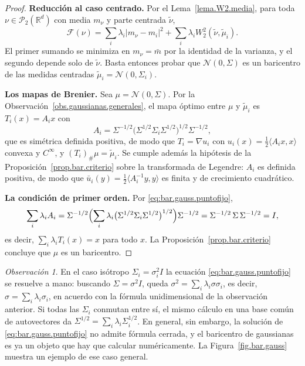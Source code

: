 \documentclass[12pt, a4paper]{amsbook}
\newcommand{\R}{{\mathbb R}}
\theoremstyle{remark}
\newtheorem{obs}[teo]{Observación}
\theoremstyle{definition}
\numberwithin{section}{chapter}
\numberwithin{subsection}{section}
\numberwithin{equation}{section}
\numberwithin{figure}{chapter}
\begin{document}
\begin{proof}
\textbf{Reducción al caso centrado.} Por el Lema~\ref{lema.W2.media}, para
toda $\nu\in\mathcal P_2(\R^d)$ con media $m_\nu$ y parte centrada
$\widetilde\nu$,
\[
\mathcal F(\nu)=\sum_i\lambda_i|m_\nu-m_i|^2+\sum_i\lambda_iW_2^2(\widetilde\nu,\widetilde\mu_i).
\]
El primer sumando se minimiza en $m_\nu=\bar m$ por la identidad de la
varianza, y el segundo depende solo de $\widetilde\nu$. Basta entonces probar
que $\mathcal N(0,\Sigma)$ es un baricentro de las medidas centradas
$\widetilde\mu_i=\mathcal N(0,\Sigma_i)$.

\medskip
\textbf{Los mapas de Brenier.} Sea $\mu=\mathcal N(0,\Sigma)$. Por la
Observación~\ref{obs.gaussianas.generales}, el mapa óptimo entre $\mu$ y
$\widetilde\mu_i$ es $T_i(x)=A_ix$ con
\[
A_i=\Sigma^{-1/2}\bigl(\Sigma^{1/2}\Sigma_i\Sigma^{1/2}\bigr)^{1/2}\Sigma^{-1/2},
\]
que es simétrica definida positiva, de modo que $T_i=\nabla u_i$ con
$u_i(x)=\tfrac12\langle A_ix,x\rangle$ convexa y $C^\infty$, y
$(T_i)_\#\mu=\widetilde\mu_i$. Se cumple además la hipótesis de la
Proposición~\ref{prop.bar.criterio} sobre la transformada de Legendre: $A_i$
es definida positiva, de modo que
$\bar u_i(y)=\tfrac12\langle A_i^{-1}y,y\rangle$ es finita y de crecimiento
cuadrático.

\medskip
\textbf{La condición de primer orden.} Por \eqref{eq:bar.gauss.puntofijo},
\[
\sum_i\lambda_iA_i
=\Sigma^{-1/2}\Bigl(\sum_i\lambda_i\bigl(\Sigma^{1/2}\Sigma_i\Sigma^{1/2}\bigr)^{1/2}\Bigr)\Sigma^{-1/2}
=\Sigma^{-1/2}\,\Sigma\,\Sigma^{-1/2}=I,
\]
es decir, $\sum_i\lambda_iT_i(x)=x$ para todo $x$. La
Proposición~\ref{prop.bar.criterio} concluye que $\mu$ es un baricentro.
\end{proof}

\begin{obs}
En el caso isótropo $\Sigma_i=\sigma_i^2I$ la ecuación
\eqref{eq:bar.gauss.puntofijo} se resuelve a mano: buscando $\Sigma=\sigma^2I$,
queda $\sigma^2=\sum_i\lambda_i\sigma\sigma_i$, es decir,
$\sigma=\sum_i\lambda_i\sigma_i$, en acuerdo con la fórmula unidimensional de
la observación anterior. Si todas las $\Sigma_i$ conmutan entre sí, el mismo
cálculo en una base común de autovectores da
$\Sigma^{1/2}=\sum_i\lambda_i\Sigma_i^{1/2}$. En general, sin embargo, la
solución de \eqref{eq:bar.gauss.puntofijo} no admite fórmula cerrada, y el
baricentro de gaussianas es ya un objeto que hay que calcular numéricamente.
La Figura~\ref{fig.bar.gauss} muestra un ejemplo de ese caso general.
\end{obs}
\end{document}
